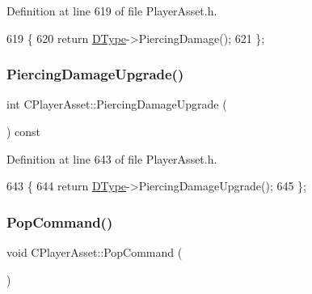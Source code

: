 Definition at line 619 of file Player\+Asset.\+h.


\begin{DoxyCode}
619                                   \{
620             \textcolor{keywordflow}{return} \hyperlink{classCPlayerAsset_a5d61f73471e1e6f0a6ab15f2ffa7b359}{DType}->PiercingDamage(); 
621         \};
\end{DoxyCode}
\hypertarget{classCPlayerAsset_af7403a6a0eab4eaedd2b04d66e21d601}{}\label{classCPlayerAsset_af7403a6a0eab4eaedd2b04d66e21d601} 
\subsubsection{\texorpdfstring{Piercing\+Damage\+Upgrade()}{PiercingDamageUpgrade()}}
{\footnotesize\ttfamily int C\+Player\+Asset\+::\+Piercing\+Damage\+Upgrade (\begin{DoxyParamCaption}{ }\end{DoxyParamCaption}) const\hspace{0.3cm}{\ttfamily [inline]}}



Definition at line 643 of file Player\+Asset.\+h.


\begin{DoxyCode}
643                                          \{
644             \textcolor{keywordflow}{return} \hyperlink{classCPlayerAsset_a5d61f73471e1e6f0a6ab15f2ffa7b359}{DType}->PiercingDamageUpgrade();
645         \};
\end{DoxyCode}
\hypertarget{classCPlayerAsset_ae443fc4aa41aaa71d1d553f2ca9d9999}{}\label{classCPlayerAsset_ae443fc4aa41aaa71d1d553f2ca9d9999} 
\subsubsection{\texorpdfstring{Pop\+Command()}{PopCommand()}}
{\footnotesize\ttfamily void C\+Player\+Asset\+::\+Pop\+Command (\begin{DoxyParamCaption}{ }\end{DoxyParamCaption})\hspace{0.3cm}{\ttfamily [inline]}}



